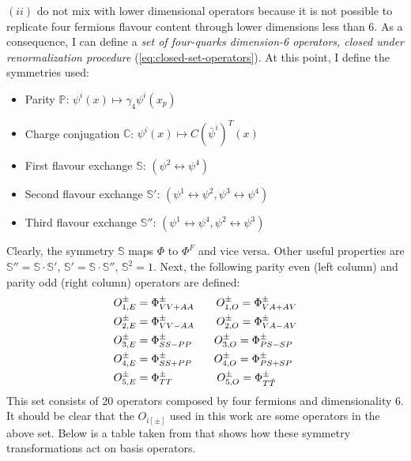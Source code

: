 \documentclass[english, LaM, oneside, noexaminfo]{sapthesis}
\begin{document}
$(ii)$ do not mix with lower dimensional operators because it is not possible to replicate four fermions flavour content through lower dimensions less than 6.
As a consequence, I can define a {\it set of four-quarks dimension-6 operators, closed under renormalization procedure} (\ref{eq:closed-set-operators}).
At this point, I define the symmetries used:
\begin{itemize}
    \item Parity $\mathbb{P}$: $\psi^i (x) \mapsto \gamma_4 \psi^i (x_p)$
    \item Charge conjugation $\mathbb{C}$: $\psi^i (x) \mapsto C \left(\bar\psi^{i}\right)^T (x)$
    \item First flavour exchange $\mathbb{S}$: $(\psi^2 \leftrightarrow \psi^4)$
    \item Second flavour exchange $\mathbb{S}'$: $(\psi^1 \leftrightarrow \psi^2, \psi^3 \leftrightarrow \psi^4)$
    \item Third flavour exchange $\mathbb{S}''$: $(\psi^1 \leftrightarrow \psi^4, \psi^2 \leftrightarrow \psi^3)$
\end{itemize}
Clearly, the symmetry $\mathbb{S}$ maps $\Phi$ to $\Phi^F$ and vice versa.
Other useful properties are $\mathbb{S}'' = \mathbb{S}\cdot \mathbb{S}'$, $\mathbb{S}' = \mathbb{S}\cdot \mathbb{S}''$, $\mathbb{S}^2 = 1$.
Next, the following parity even (left column) and parity odd (right column) operators are defined:
\begin{equation}\label{eq:closed-set-operators}
    \begin{split}
        & O_{1,E}^\pm = \Phi^\pm_{VV+AA} \qquad O_{1,O}^\pm = \Phi^\pm_{VA+AV} \\
        & O_{2,E}^\pm = \Phi^\pm_{VV-AA} \qquad O_{2,O}^\pm = \Phi^\pm_{VA-AV} \\
        & O_{3,E}^\pm = \Phi^\pm_{SS-PP} \qquad O_{3,O}^\pm = \Phi^\pm_{PS-SP} \\
        & O_{4,E}^\pm = \Phi^\pm_{SS+PP} \qquad O_{4,O}^\pm = \Phi^\pm_{PS+SP} \\
        & O_{5,E}^\pm = \Phi^\pm_{TT}    \hspace*{40pt} O_{5,O}^\pm = \Phi^\pm_{T\tilde{T}} \\
    \end{split}
\end{equation}
This set consists of 20 operators composed by four fermions and dimensionality 6.
It should be clear that the $O_{i[\pm]}$ used in this work are some operators in the above set.
Below is a table taken from \cite{DoniniMartinelliOperators} that shows how these symmetry transformations act on basis operators.
\end{document}
